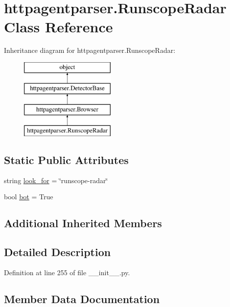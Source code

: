 \hypertarget{classhttpagentparser_1_1_runscope_radar}{}\section{httpagentparser.\+Runscope\+Radar Class Reference}
\label{classhttpagentparser_1_1_runscope_radar}
Inheritance diagram for httpagentparser.\+Runscope\+Radar\+:\begin{figure}[H]
\begin{center}
\leavevmode
\includegraphics[height=4.000000cm]{classhttpagentparser_1_1_runscope_radar}
\end{center}
\end{figure}
\subsection*{Static Public Attributes}
\begin{DoxyCompactItemize}
\item 
string \hyperlink{classhttpagentparser_1_1_runscope_radar_abf5a8780ab5a1d8addcefc8ef5ea45c3}{look\+\_\+for} = \char`\"{}runscope-\/radar\char`\"{}
\item 
bool \hyperlink{classhttpagentparser_1_1_runscope_radar_a531e33d767ccde2adb5e456278fc1fa6}{bot} = True
\end{DoxyCompactItemize}
\subsection*{Additional Inherited Members}


\subsection{Detailed Description}


Definition at line 255 of file \+\_\+\+\_\+init\+\_\+\+\_\+.\+py.



\subsection{Member Data Documentation}
\hypertarget{classhttpagentparser_1_1_runscope_radar_a531e33d767ccde2adb5e456278fc1fa6}{}\label{classhttpagentparser_1_1_runscope_radar_a531e33d767ccde2adb5e456278fc1fa6} 
